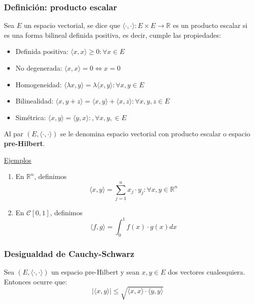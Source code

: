 \documentclass[10pt,a4paper,openright]{book}
\theoremstyle{break}
\begin{document}
\subsubsection*{Definición: producto escalar}
Sea $E$ un espacio vectorial, se dice que $\langle \cdot, \cdot\rangle: E\times E \rightarrow \mathbb R$ es un producto escalar si es una forma bilineal definida positiva, es decir, cumple las propiedades:
\begin{itemize}
\item Definida positiva: $\langle x,x \rangle \geq 0 : \forall x \in E$
\item No degenerada: $\langle x,x \rangle = 0 \Leftrightarrow x = 0$
\item Homogeneidad: $\langle \lambda x, y \rangle = \lambda \langle x,y\rangle : \forall x, y \in E$
\item Bilinealidad: $\langle x,y+z\rangle = \langle x,y\rangle + \langle x,z\rangle : \forall x, y ,z \in E$
\item Simétrica: $\langle x,y\rangle = \langle y,x\rangle: ,\forall x, y ,\in E$
\end{itemize}
Al par $(E, \langle \cdot, \cdot\rangle)$ se le denomina espacio vectorial con producto escalar o espacio \textbf{pre-Hilbert}.

\underline{Ejemplos}
\begin{enumerate}
\item En $\mathbb{R}^n$, definimos $$\langle x,y\rangle = \sum_{j=1}^{n} x_j \cdot y_j : \forall x,y \in \mathbb{R}^n$$

\item En $\mathcal{C}[0,1]$, definimos $$\langle f,g \rangle = \int_{0}^{1} f(x) \cdot g(x) dx$$
\end{enumerate}

\subsubsection*{Desigualdad de Cauchy-Schwarz}
Sea $(E, \langle\cdot, \cdot\rangle)$ un espacio pre-Hilbert y sean $x,y \in E$ dos vectores cualesquiera. Entonces ocurre que:
$$|\langle x,y\rangle| \leq \sqrt{\langle x,x \rangle \cdot \langle y,y\rangle}$$
\end{document}
